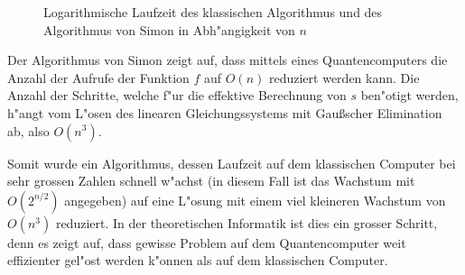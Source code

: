 \begin{refsection}
\begin{figure}
\centering
{}
\caption{Logarithmische Laufzeit des klassischen Algorithmus und des
Algorithmus von Simon in Abh"angigkeit von $n$\label{simon:laufzeitgraph}}
\end{figure}

Der Algorithmus von Simon zeigt auf, dass mittels eines Quantencomputers die
Anzahl der Aufrufe der Funktion $f$ auf $O(n)$ reduziert werden kann. Die
Anzahl der Schritte, welche f"ur die effektive Berechnung von $s$ ben"otigt
werden, h"angt vom L"osen des linearen Gleichungssystems mit Gaußscher
Elimination ab, also $O(n^3)$. 
\cite{simon:cs191}

Somit wurde ein Algorithmus, dessen Laufzeit auf dem klassischen Computer bei
sehr grossen Zahlen schnell w"achst (in diesem Fall ist das Wachstum mit
$O(2^{n/2})$ angegeben) auf eine L"osung mit einem viel kleineren Wachstum von
$O(n^3)$ reduziert. In der theoretischen Informatik ist dies ein grosser
Schritt, denn es zeigt auf, dass gewisse Problem auf dem Quantencomputer weit
effizienter gel"ost werden k"onnen als auf dem klassischen Computer.


\printbibliography[heading=subbibliography] \end{refsection}


